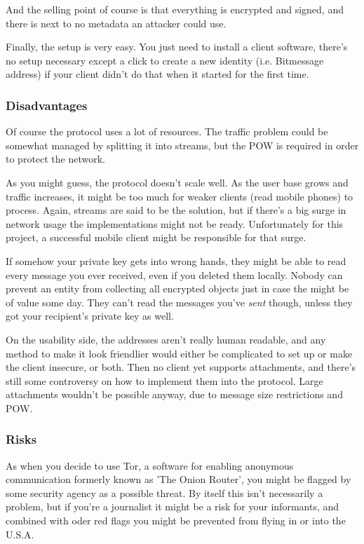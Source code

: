 \documentclass{bfh}
\begin{document}
  And the selling point of course is that everything is encrypted and signed, and there is next to no metadata an attacker could use.

  Finally, the setup is very easy. You just need to install a client software, there's no setup necessary except a click to create a new identity (i.e. Bitmessage address) if your client didn't do that when it started for the first time.

  \subsubsection{Disadvantages}
  Of course the protocol uses a lot of resources. The traffic problem could be somewhat managed by splitting it into streams\cite{wiki:stream}, but the \ac{POW} is required in order to protect the network.

  As you might guess, the protocol doesn't scale well. As the user base grows and traffic increases, it might be too much for weaker clients (read mobile phones) to process. Again, streams are said to be the solution, but if there's a big surge in network usage the implementations might not be ready. Unfortunately for this project, a successful mobile client might be responsible for that surge.

  If somehow your private key gets into wrong hands, they might be able to read every message you ever received, even if you deleted them locally. Nobody can prevent an entity from collecting all encrypted objects just in case the might be of value some day. They can't read the messages you've \textit{sent} though, unless they got your recipient's private key as well.

  On the usability side, the addresses aren't really human readable, and any method to make it look friendlier would either be complicated to set up or make the client insecure, or both. Then no client yet supports attachments, and there's still some controversy on how to implement them into the protocol. Large attachments wouldn't be possible anyway, due to message size restrictions and \ac{POW}.

  \subsubsection{Risks}
  As when you decide to use Tor, a software for enabling anonymous communication formerly known as 'The Onion Router', you might be flagged by some security agency as a possible threat.\cite{wired:tor} By itself this isn't necessarily a problem, but if you're a journalist it might be a risk for your informants, and combined with oder red flags you might be prevented from flying in or into the U.S.A.
\end{document}
